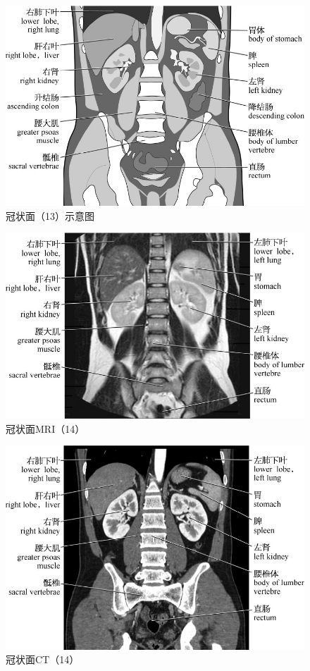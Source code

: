 \begin{figure}[!htbp]
 \centering
 \includegraphics{./images/Image00130.jpg}
 \captionsetup{justification=centering}
 \caption{冠状面（13）示意图}
  \end{figure} 
 \FloatBarrier

\begin{figure}[!htbp]
 \centering
 \includegraphics{./images/Image00131.jpg}
 \captionsetup{justification=centering}
 \caption{冠状面MRI（14）}
  \end{figure} 
 \FloatBarrier

\begin{figure}[!htbp]
 \centering
 \includegraphics{./images/Image00132.jpg}
 \captionsetup{justification=centering}
 \caption{冠状面CT（14）}
  \end{figure} 
 \FloatBarrier

